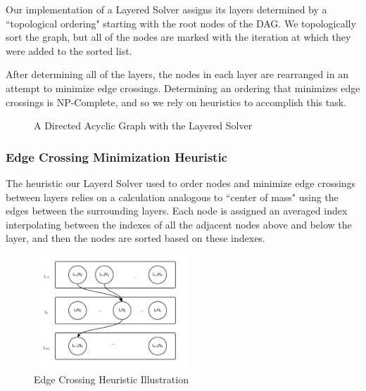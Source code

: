 \documentclass{article}
\begin{document}
Our implementation of a Layered Solver assigns its layers determined by a ``topological ordering" starting with the root nodes of the DAG. We topologically sort the graph, but all of the nodes are marked with the iteration at which they were added to the sorted list. 

After determining all of the layers, the nodes in each layer are rearranged in an attempt to minimize edge crossings. Determining an ordering that minimizes edge crossings is NP-Complete\cite{EdgeCrossings}, and so we rely on heuristics to accomplish this task.

\begin{figure}
\caption{A Directed Acyclic Graph with the Layered Solver}
\end{figure}



\subsubsection{Edge Crossing Minimization Heuristic}
The heuristic our Layerd Solver used to order nodes and minimize edge crossings between layers relies on a calculation analogous to ``center of mass" using the edges between the surrounding layers. Each node is assigned an averaged index interpolating between the indexes of all the adjacent nodes above and below the layer, and then the nodes are sorted based on these indexes. 


\begin{figure}
\caption{Edge Crossing Heuristic Illustration}\label{layers}
\centering
\includegraphics[width=0.52\textwidth]{layereddia.png}
\end{figure}
\end{document}
